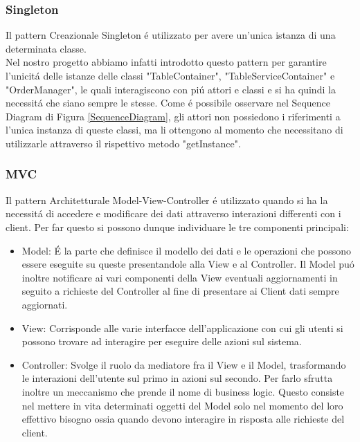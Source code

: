 \documentclass{article}
\begin{document}
\newpage

\subsubsection{Singleton}

Il pattern Creazionale Singleton \'e utilizzato per avere un'unica istanza di una determinata classe. \\
Nel nostro progetto abbiamo infatti introdotto questo pattern per garantire l'unicit\'a delle istanze delle classi "TableContainer", "TableServiceContainer" e "OrderManager", le quali interagiscono con pi\'u attori e classi e si ha quindi la necessit\'a che siano sempre le stesse. Come \'e possibile osservare nel Sequence Diagram di Figura \ref{SequenceDiagram}, gli attori non possiedono i riferimenti a l'unica instanza di queste classi, ma li ottengono al momento che necessitano di utilizzarle attraverso il rispettivo metodo "getInstance".

\subsubsection{MVC}

Il pattern Architetturale Model-View-Controller \'e utilizzato quando si ha la necessit\'a di accedere e modificare dei dati attraverso interazioni differenti con i client. Per far questo si possono dunque individuare le tre componenti principali:

\begin{itemize}
\item Model: \'E la parte che definisce il modello dei dati e le operazioni che possono essere  eseguite su queste presentandole alla View e al Controller. Il Model pu\'o inoltre notificare ai vari componenti della View eventuali aggiornamenti in seguito a richieste del Controller al fine di presentare ai Client dati sempre aggiornati.

\item View: Corrisponde alle varie interfacce dell'applicazione con cui gli utenti si possono trovare ad interagire per eseguire delle azioni sul sistema.
 
\item Controller: Svolge il ruolo da mediatore fra il View e il Model, trasformando le interazioni dell'utente sul primo in azioni sul secondo. Per farlo sfrutta inoltre un meccanismo che prende il nome di business logic. Questo consiste nel mettere in vita determinati oggetti del Model solo nel momento del loro effettivo bisogno ossia quando devono interagire in risposta alle richieste del client.
\end{itemize}
\end{document}

